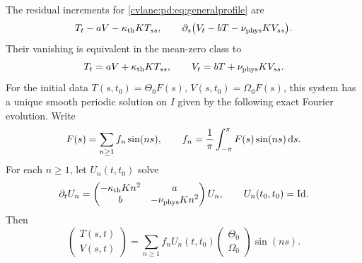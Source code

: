 \begin{cvlanepdproposition}\label{cvlane:pd:prop:profile}
The residual increments for \eqref{cvlane:pd:eq:generalprofile} are
\begin{equation}\label{cvlane:pd:eq:profileR}
 T_t-aV-\kappa_{\rm th} K T_{ss},\qquad
 \partial_s\big(V_t-bT-\nu_{\rm phys} K V_{ss}\big).
\end{equation}
Their vanishing is equivalent in the mean-zero class to
\begin{equation}\label{cvlane:pd:eq:profilePDE}
 T_t=aV+\kappa_{\rm th} K T_{ss},\qquad
 V_t=bT+\nu_{\rm phys} K V_{ss}.
\end{equation}
For the initial data $T(s,t_0)=\Theta_0F(s)$,
$V(s,t_0)=\Omega_0F(s)$, this system has a unique smooth periodic solution
on $I$ given by the following exact Fourier evolution. Write
\begin{equation}\label{cvlane:pd:eq:fourier}
 F(s)=\sum_{n\geq1} f_n\sin(ns),\qquad
 f_n=\frac1\pi\int_{-\pi}^{\pi}F(s)\sin(ns)\,\mathrm d s.
\end{equation}
For each $n\geq1$, let $U_n(t,t_0)$ solve
\begin{equation}\label{cvlane:pd:eq:Un}
 \partial_t U_n=
 \begin{pmatrix}-\kappa_{\rm th} K n^2&a\\b&-\nu_{\rm phys} K n^2\end{pmatrix}U_n,
 \qquad U_n(t_0,t_0)=\mathrm{Id}.
\end{equation}
Then
\begin{equation}\label{cvlane:pd:eq:profileSolution}
 \begin{pmatrix}T(s,t)\\V(s,t)\end{pmatrix}
 =\sum_{n\geq1}f_n U_n(t,t_0)
       \begin{pmatrix}\Theta_0\\\Omega_0\end{pmatrix}\sin(ns).
\end{equation}
\end{cvlanepdproposition}
